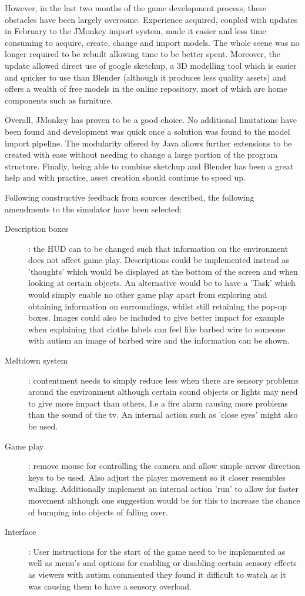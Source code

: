 \documentclass[11pt]{report}
\begin{document}
However, in the last two months of the game development process, these obstacles have been largely overcome. Experience acquired, coupled with updates in February to the JMonkey import system, made it easier and less time consuming to acquire, create, change and import models. The whole scene was no longer required to be rebuilt allowing time to be better spent. Moreover, the update allowed direct use of google sketchup, a 3D modelling tool which is easier and quicker to use than Blender (although it produces less quality assets) and offers a wealth of free models in the online repository, most of which are home components such as furniture.

Overall, JMonkey has proven to be a good choice. No additional limitations have been found and development was quick once a solution was found to the model import pipeline. The modularity offered by Java allows further extensions to be created with ease without needing to change a large portion of the program structure. Finally, being able to combine sketchup and Blender has been a great help and with practice, asset creation should continue to speed up.

Following constructive feedback from sources described, the following amendments to the simulator have been selected:

\begin{description}
\item [Description boxes]: the HUD can to be changed such that information on the environment does not affect game play. Descriptions could be implemented instead as 'thoughts' which would be displayed at the bottom of the screen and when looking at certain objects. An alternative would be to have a 'Task' which would simply enable no other game play apart from exploring and obtaining information on surroundings, whilst still retaining the pop-up boxes. Images could also be included to give better impact for example when explaining that clothe labels can feel like barbed wire to someone with autism an image of barbed wire and the information can be shown.
\item [Meltdown system]: contentment needs to simply reduce less when there are sensory problems around the environment although certain sound objects or lights may need to give more impact than others. I.e a fire alarm causing more problems than the sound of the tv. An internal action such as 'close eyes' might also be used.
\item [Game play]: remove mouse for controlling the camera and allow simple arrow direction keys to be used. Also adjust the player movement so it closer resembles walking. Additionally implement an internal action 'run' to allow for faster movement although one suggestion would be for this to increase the chance of bumping into objects of falling over. 
\item [Interface]: User instructions for the start of the game need to be implemented as well as menu's and options for enabling or disabling certain sensory effects as viewers with autism commented they found it difficult to watch as it was causing them to have a sensory overload. 
\end{description}
\end{document}
